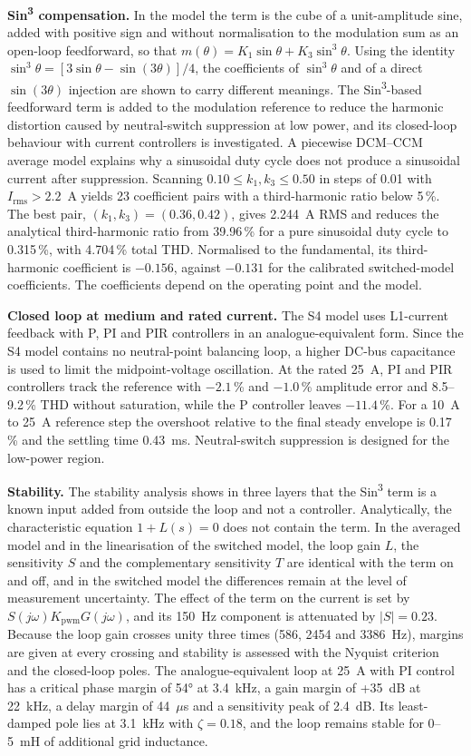 \begin{summary}
\textbf{Sin\textsuperscript{3} compensation.} In the model the term is the cube of a unit-amplitude sine, added with positive sign and without normalisation to the modulation sum as an open-loop feedforward, so that $m(\theta)=K_1\sin\theta+K_3\sin^3\theta$. Using the identity $\sin^3\theta=[3\sin\theta-\sin(3\theta)]/4$, the coefficients of $\sin^3\theta$ and of a direct $\sin(3\theta)$ injection are shown to carry different meanings. The Sin\textsuperscript{3}-based feedforward term is added to the modulation reference to reduce the harmonic distortion caused by neutral-switch suppression at low power, and its closed-loop behaviour with current controllers is investigated. A piecewise DCM--CCM average model explains why a sinusoidal duty cycle does not produce a sinusoidal current after suppression. Scanning $0.10\leq k_1,k_3\leq0.50$ in steps of 0.01 with $I_{\mathrm{rms}}>2.2$~A yields 23 coefficient pairs with a third-harmonic ratio below 5\,\%. The best pair, $(k_1,k_3)=(0.36,0.42)$, gives 2.244~A RMS and reduces the analytical third-harmonic ratio from 39.96\,\% for a pure sinusoidal duty cycle to 0.315\,\%, with 4.704\,\% total THD. Normalised to the fundamental, its third-harmonic coefficient is $-0.156$, against $-0.131$ for the calibrated switched-model coefficients. The coefficients depend on the operating point and the model.

\textbf{Closed loop at medium and rated current.} The S4 model uses L1-current feedback with P, PI and PIR controllers in an analogue-equivalent form. Since the S4 model contains no neutral-point balancing loop, a higher DC-bus capacitance is used to limit the midpoint-voltage oscillation. At the rated 25~A, PI and PIR controllers track the reference with $-2.1$\,\% and $-1.0$\,\% amplitude error and 8.5--9.2\,\% THD without saturation, while the P controller leaves $-11.4$\,\%. For a 10~A to 25~A reference step the overshoot relative to the final steady envelope is 0.17\,\% and the settling time 0.43~ms. Neutral-switch suppression is designed for the low-power region.

\textbf{Stability.} The stability analysis shows in three layers that the Sin\textsuperscript{3} term is a known input added from outside the loop and not a controller. Analytically, the characteristic equation $1+L(s)=0$ does not contain the term. In the averaged model and in the linearisation of the switched model, the loop gain $L$, the sensitivity $S$ and the complementary sensitivity $T$ are identical with the term on and off, and in the switched model the differences remain at the level of measurement uncertainty. The effect of the term on the current is set by $S(j\omega)K_{\mathrm{pwm}}G(j\omega)$, and its 150~Hz component is attenuated by $|S|=0.23$. Because the loop gain crosses unity three times (586, 2454 and 3386~Hz), margins are given at every crossing and stability is assessed with the Nyquist criterion and the closed-loop poles. The analogue-equivalent loop at 25~A with PI control has a critical phase margin of 54° at 3.4~kHz, a gain margin of +35~dB at 22~kHz, a delay margin of 44~$\mu$s and a sensitivity peak of 2.4~dB. Its least-damped pole lies at 3.1~kHz with $\zeta=0.18$, and the loop remains stable for 0--5~mH of additional grid inductance.


\end{summary}
